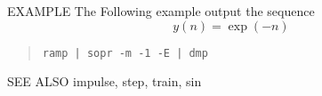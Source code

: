 \begin{options}
\end{options}

\begin{qsection}{EXAMPLE}
The Following example output the sequence 
\begin{displaymath}
  y(n)=\exp(-n)
\end{displaymath}
\begin{quote}
\verb!ramp | sopr -m -1 -E | dmp!
\end{quote}
\end{qsection}

\begin{qsection}{SEE ALSO}
  impulse, step, train, sin
\end{qsection}
